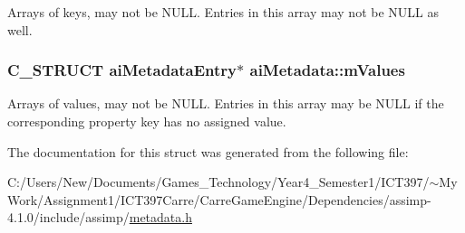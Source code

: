 Arrays of keys, may not be NULL. Entries in this array may not be NULL as well. \hypertarget{structai_metadata_34b515fcb5b806c471d3c6ce7bc76beb}{
\subsubsection[mValues]{\setlength{\rightskip}{0pt plus 5cm}C\_\-STRUCT {\bf aiMetadataEntry}$\ast$ {\bf aiMetadata::mValues}}}
\label{structai_metadata_34b515fcb5b806c471d3c6ce7bc76beb}


Arrays of values, may not be NULL. Entries in this array may be NULL if the corresponding property key has no assigned value. 

The documentation for this struct was generated from the following file:\begin{CompactItemize}
\item 
C:/Users/New/Documents/Games\_\-Technology/Year4\_\-Semester1/ICT397/$\sim$My Work/Assignment1/ICT397Carre/CarreGameEngine/Dependencies/assimp-4.1.0/include/assimp/\hyperlink{metadata_8h}{metadata.h}\end{CompactItemize}

